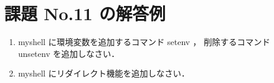 \documentclass[a4j,twcolumn,11pt,nomag]{ltjarticle}      %
\begin{document}
\onecolumn

\section*{課題 No.11 の解答例}
\begin{enumerate}
\item myshell に環境変数を追加するコマンド setenv ，
  削除するコマンド unsetenv を追加しなさい．
\item myshell にリダイレクト機能を追加しなさい．
\end{enumerate}

\end{document}
